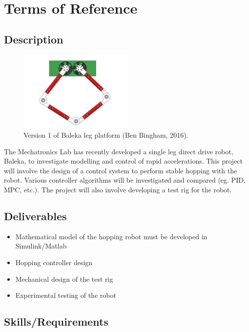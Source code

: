 \chapter{Terms of Reference}

\section*{Description}

\begin{figure}[H]
\centering
\includegraphics[width=0.5\textwidth,trim={0cm 0cm 0cm 0cm},clip]{images/mechanical/legsV1.pdf}
\caption{Version 1 of Baleka leg platform (Ben Bingham, 2016).}
\label{fig:legV1}
\end{figure}

The Mechatronics Lab has recently developed a single leg direct drive robot,
Baleka, to investigate modelling and control of rapid accelerations.
This project will involve the design of a control system to perform stable
hopping with the robot. Various controller algorithms will be investigated and
compared (eg. PID, MPC, etc.). The project will also involve developing a test
rig for the robot.

\section*{Deliverables}

\begin{itemize}
\item Mathematical model of the hopping robot must be developed in
Simulink/Matlab
\item Hopping controller design
\item Mechanical design of the test rig
\item Experimental testing of the robot
\end{itemize}

\section*{Skills/Requirements}

